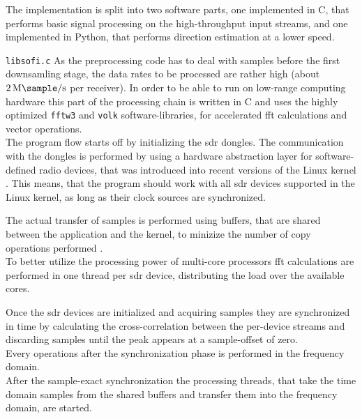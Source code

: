The implementation is split into two software parts,
one implemented in C, that performs basic signal
processing on the high-throughput input streams, and
one implemented in Python, that performs direction estimation
at a lower speed.

\begin{subchapter}{\texttt{libsofi.c}}
  As the preprocessing code has to deal with samples
  before the first downsamling stage, the data rates to be
  processed are rather high
  (about $\SI{2}{\mega\sample\per\second}$ per receiver).
  In order to be able to run on low-range computing hardware
  this part of the processing chain is written in C and
  uses the highly optimized \texttt{fftw3} \cite{fftwweb}
  and \texttt{volk} \cite{volkweb}
  software-libraries, for accelerated \gls{fft} calculations
  and vector operations. \\

  The program flow starts off by initializing the \gls{sdr}
  dongles. The communication with the dongles is performed
  by using a hardware abstraction layer for software-defined radio
  devices, that was introduced into recent versions of
  the Linux kernel \cite{v4lsdr}. This means, that the program should work
  with all \gls{sdr} devices supported in the Linux kernel,
  as long as their clock sources are synchronized.

  The actual transfer of samples is performed using
  buffers, that are shared between the application and
  the kernel, to minizize the number of
  copy operations performed \cite{v4lmmap}. \\

  To better utilize the processing power of multi-core processors
  \gls{fft} calculations are performed in one thread per
  \gls{sdr} device, distributing the load over the available cores.

  Once the \gls{sdr} devices are initialized and acquiring samples
  they are synchronized in time by calculating the
  cross-correlation between the per-device streams
  and discarding samples until the peak appears at a
  sample-offset of zero. \\

  Every operations after the synchronization phase is
  performed in the frequency domain. \\

  After the sample-exact synchronization the processing threads, that
  take the time domain samples from the shared buffers and transfer
  them into the frequency domain, are started.


\end{subchapter}
